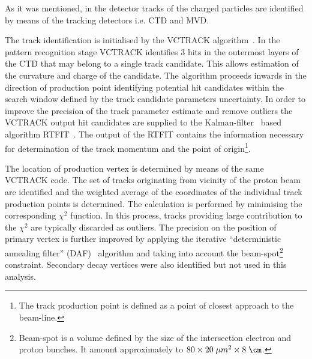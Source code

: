 As it was mentioned, in the \zeus detector tracks of the charged particles are identified by means of the tracking detectors i.e. CTD and MVD.

The track identification is initialised by the VCTRACK algorithm~\cite{upub:hartner:zn9858,upub:hartner:zn9764}. In the pattern recognition stage VCTRACK identifies 3 hits in the outermost layers of the CTD that may belong to a single track candidate. This allows estimation of the curvature and charge of the candidate. The algorithm proceeds inwards in the direction of production point identifying potential hit candidates within the search window defined by the track candidate parameters uncertainty. In order to improve the precision of the track parameter estimate and remove outliers the VCTRACK output hit candidates are supplied to the Kalman-filter~\cite{Klaman:1960} based algorithm RTFIT~\cite{upub:spiridonov:rtfit}. The output of the RTFIT contains the information necessary for determination of the track momentum and the point of origin\footnote{The track production point is defined as a point of closest approach to the beam-line.}.

The location of production vertex is determined by means of the same VCTRACK code. The set of tracks originating from vicinity of the proton beam are identified and the weighted average of the coordinates of the individual track production points is determined. The calculation is performed by minimising the corresponding $\chi^2$ function. In this process, tracks providing large contribution to the $\chi^2$ are typically discarded as outliers. The precision on the position of primary vertex is further improved by applying the iterative ``deterministic annealing filter'' (DAF)~\cite{Fruewirth:2010} algorithm and taking into account the beam-spot\footnote{Beam-spot is a volume defined by the size of the intersection electron and proton bunches. It amount approximately to $80 \times 20\; \mu m^{2} \times 8\; \cm$.} constraint. Secondary decay vertices were also identified but not used in this analysis.